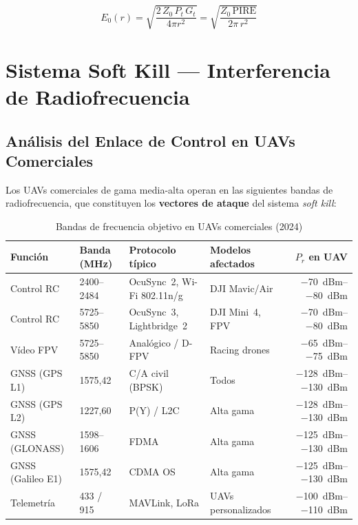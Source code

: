 \documentclass[12pt,a4paper]{article}
\begin{document}
\begin{equation}
  E_0(r) = \sqrt{\frac{2\,Z_0\,P_t\,G_t}{4\pi r^2}}
          = \sqrt{\frac{Z_0\,\mathrm{PIRE}}{2\pi\,r^2}}
  \label{eq:campo_distancia}
\end{equation}

\newpage

\section{Sistema Soft Kill — Interferencia de Radiofrecuencia}

\subsection{Análisis del Enlace de Control en UAVs Comerciales}

Los UAVs comerciales de gama media-alta operan en las siguientes bandas
de radiofrecuencia, que constituyen los \textbf{vectores de ataque} del
sistema \textit{soft kill}:

\begin{table}[H]
\centering
\caption{Bandas de frecuencia objetivo en UAVs comerciales (2024)}
\label{tab:frecuencias}
\renewcommand{\arraystretch}{1.25}
\begin{tabularx}{\textwidth}{lXllr}
\toprule
\textbf{Función} &
\textbf{Banda (MHz)} &
\textbf{Protocolo típico} &
\textbf{Modelos afectados} &
\textbf{$P_r$ en UAV} \\
\midrule
Control RC & 2400–2484 & OcuSync~2, Wi-Fi 802.11n/g & DJI Mavic/Air & \SIrange{-70}{-80}{dBm} \\
Control RC & 5725–5850 & OcuSync~3, Lightbridge~2 & DJI Mini~4, FPV & \SIrange{-70}{-80}{dBm} \\
Vídeo FPV & 5725–5850 & Analógico / D-FPV & Racing drones & \SIrange{-65}{-75}{dBm} \\
GNSS (GPS L1) & 1575,42 & C/A civil (BPSK) & Todos & \SIrange{-128}{-130}{dBm} \\
GNSS (GPS L2) & 1227,60 & P(Y) / L2C & Alta gama & \SIrange{-128}{-130}{dBm} \\
GNSS (GLONASS) & 1598–1606 & FDMA & Alta gama & \SIrange{-125}{-130}{dBm} \\
GNSS (Galileo E1) & 1575,42 & CDMA OS & Alta gama & \SIrange{-125}{-130}{dBm} \\
Telemetría & 433 / 915 & MAVLink, LoRa & UAVs personalizados & \SIrange{-100}{-110}{dBm} \\
\bottomrule
\end{tabularx}
\end{table}
\end{document}
